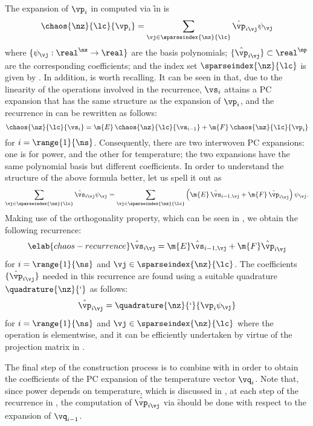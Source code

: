The expansion of $\vp_i$ in  computed via \f in
 is
\[
  \chaos{\nz}{\lc}{\vp_i} = \sum_{\vj \in \sparseindex{\nz}{\lc}} \hat{\vp}_{i \vj} \psi_{\vj}
\]
where $\{ \psi_{\vj}: \real^\nz \to \real \}$ are the basis polynomials; $\{
\hat{\vp}_{i \vj} \} \subset \real^\np$ are the corresponding coefficients; and
the index set $\sparseindex{\nz}{\lc}$ is given by
. In addition,
 is worth recalling. It can be seen in
 that, due to the linearity of the operations
involved in the recurrence, $\vs_i$ attains a \ac{PC} expansion that has the
same structure as the expansion of $\vp_i$, and the recurrence in
 can be rewritten as follows:
\[
  \chaos{\nz}{\lc}{\vs_i} = \m{E} \, \chaos{\nz}{\lc}{\vs_{i - 1}} + \m{F} \, \chaos{\nz}{\lc}{\vp_i}
\]
for $i = \range{1}{\ns}$. Consequently, there are two interwoven \ac{PC}
expansions: one is for power, and the other for temperature; the two expansions
have the same polynomial basis but different coefficients. In order to
understand the structure of the above formula better, let us spell it out as
\[
  \sum_{\vj \in \sparseindex{\nz}{\lc}} \hat{\vs}_{i \vj} \psi_{\vj} =
  \sum_{\vj \in \sparseindex{\nz}{\lc}} \left(\m{E} \, \hat{\vs}_{i - 1, \vj} + \m{F} \, \hat{\vp}_{i \vj}\right) \psi_{\vj}.
\]
Making use of the orthogonality property, which can be seen in
, we obtain the following recurrence:
\begin{equation} \elab{chaos-recurrence}
  \hat{\vs}_{i \vj} = \m{E} \hat{\vs}_{i - 1, \vj} + \m{F} \hat{\vp}_{i \vj}
\end{equation}
for $i = \range{1}{\ns}$ and $\vj \in \sparseindex{\nz}{\lc}$. The coefficients
$\{ \hat{\vp}_{i \vj} \}$ needed in this recurrence are found using a suitable
quadrature $\quadrature{\nz}{\lq}$ as follows:
\[
  \hat{\vp}_{i \vj} = \quadrature{\nz}{\lq}{\vp_i \psi_{\vj}}
\]
for $i = \range{1}{\ns}$ and $\vj \in \sparseindex{\nz}{\lc}$ where the
operation is elementwise, and it can be efficiently undertaken by virtue of the
projection matrix in .

The final step of the construction process is to combine 
with  in order to obtain the coefficients of the
\ac{PC} expansion of the temperature vector $\vq_i$. Note that, since power
depends on temperature, which is discussed in , at each step
of the recurrence in , the computation of $\hat{\vp}_{i
\vj}$ via \f should be done with respect to the expansion of $\vq_{i - 1}$.

